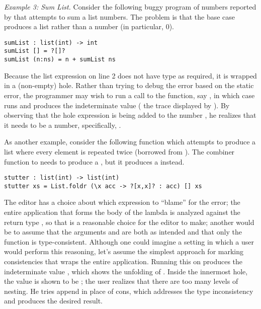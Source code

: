 \emph{Example 3: Sum List.}
%
Consider the following buggy program of numbers reported by \citet{XXX} that
attempts to sum a list numbers.
%
The problem is that the base case produces a list rather than a number (in
particular, 0).

\begin{lstlisting}
sumList : list(int) -> int
sumList [] = ?[]?
sumList (n:ns) = n + sumList ns
\end{lstlisting}

\noindent
%
Because the list expression on line 2 does not have type  as required,
it is wrapped in a (non-empty) hole.
%
Rather than trying to debug the error based on the static error, the programmer
may wish to run a call to the function, say , in which case
\HazelnutLive{} runs and produces the indeterminate value 
(\cf{} the trace displayed by \citet{Seidel2016}).
%
By observing that the hole expression is being added to the number , he
realizes that it needs to be a number, specifically, .



%
As another example, consider the following function which attempts to produce a
list where every element is repeated twice (borrowed from \citep{XXX}).
%
The combiner function to  needs to produce a , but
it produces a  instead.

\begin{lstlisting}
stutter : list(int) -> list(int)
stutter xs = List.foldr (\x acc -> ?[x,x]? : acc) [] xs
\end{lstlisting}

\noindent
%
The editor has a choice about which expression to ``blame'' for the error; the
entire application that forms the body of the lambda is analyzed against the
return type , so that is a reasonable choice for the editor to
make; another would be to assume that the arguments \li{[x,x]} and  are
both as intended and that only the function \li{(:)} is type-consistent.
%
Although one could imagine a setting in which a user would perform this
reasoning, let's assume the simplest approach for marking consistencies that
wraps the entire application.
%
Running this on  produces the indeterminate value
, which shows the unfolding of
.
%
Inside the innermost hole, the value is shown to be \li{[[3,3]]}; the user
realizes that there are too many levels of nesting.
%
He tries append in place of cons, which addresses the type inconsistency and
produces the desired result.


